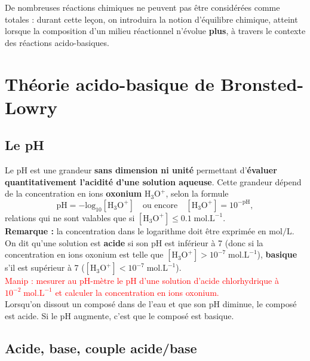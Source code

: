 \documentclass[11pt,a4paper]{report}
\begin{document}
De nombreuses réactions chimiques ne peuvent pas être considérées comme totales : durant cette leçon, on introduira la notion d'équilibre chimique, atteint lorsque la composition d'un milieu réactionnel n'évolue \textbf{plus}, à travers le contexte des réactions acido-basiques.

\section{Théorie acido-basique de Bronsted-Lowry}

\subsection{Le pH}

Le pH est une grandeur \textbf{sans dimension ni unité} permettant d'\textbf{évaluer quantitativement l'acidité d'une solution aqueuse}. Cette grandeur dépend de la concentration en ions \textbf{oxonium} $\text{H}_3\text{O}^+$, selon la formule
\begin{equation}
	\boxed{\text{pH} = -\text{log}_{10} [\text{H}_3\text{O}^+]} \quad\text{ou encore}\quad 
	\boxed{[\text{H}_3\text{O}^+] = 10^{-\text{pH}}},
\end{equation}
relations qui ne sont valables que si $[\text{H}_3\text{O}^+]\leq 0.1\;\text{mol}.\text{L}^{-1}$.\\

\textbf{Remarque :} la concentration dans le logarithme doit être exprimée en $\text{mol}/\text{L}$.\\

On dit qu'une solution est \textbf{acide} si son pH est inférieur à 7 (donc si la concentration en ions oxonium est telle que $[\text{H}_3\text{O}^+] > 10^{-7} \;\text{mol}.\text{L}^{-1}$), \textbf{basique} s'il est supérieur à 7 ($[\text{H}_3\text{O}^+] < 10^{-7} \;\text{mol}.\text{L}^{-1}$).\\

\textcolor{red}{Manip : mesurer au pH-mètre le pH d'une solution d'acide chlorhydrique à $10^{-2} \;\text{mol}.\text{L}^{-1}$ et calculer la concentration en ions oxonium.}\\

Lorsqu'on dissout un composé dans de l'eau et que son pH diminue, le composé est acide. Si le pH augmente, c'est que le composé est basique.

\subsection{Acide, base, couple acide/base}
\end{document}
